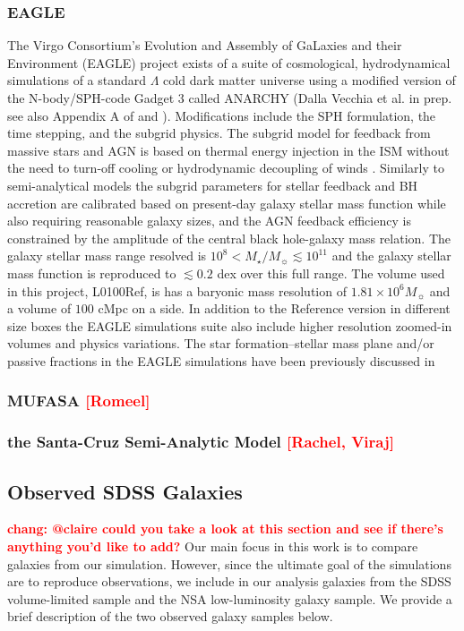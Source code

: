 \documentclass[preprint2,tighten]{aastex62}
\newcommand{\todo}[1]{{\bf \textcolor{red}{ #1}}}
\begin{document}
\subsubsection{EAGLE}
The Virgo Consortium's Evolution and Assembly of GaLaxies and their Environment (EAGLE) project \citep{schaye2015, crain2015} exists of a suite of cosmological, hydrodynamical simulations of a standard $\Lambda$ cold dark matter universe using a modified version of the N-body/SPH-code Gadget 3 \citep[lastly described in][]{springel2005} called ANARCHY (Dalla Vecchia et al. in prep. see also Appendix A of \citealp{schaye2015} and \citealp{schaller2015}). Modifications include the SPH formulation, the time stepping, and the subgrid physics. The subgrid model for feedback from massive stars and AGN is based on thermal energy injection in the ISM without the need to turn-off cooling or hydrodynamic decoupling of winds \citep{dallavecchia2012}. Similarly to semi-analytical models the subgrid parameters for stellar feedback and BH accretion are calibrated based on present-day galaxy stellar mass function while also requiring reasonable galaxy sizes, and the AGN feedback efficiency is constrained by the amplitude of the central black hole-galaxy mass relation. The galaxy stellar mass range resolved is $10^{8} < M_{\star}/M_{\sun} \lesssim 10^{11}$ and the galaxy stellar mass function is reproduced to $\lesssim 0.2$ dex over this full range. The volume used in this project, L0100Ref, is has a baryonic mass resolution of $1.81\times 10^6M_{\sun}$ and a volume of $100$ cMpc on a side. In addition to the Reference version in different size boxes the EAGLE simulations suite also include higher resolution zoomed-in volumes and physics variations. The star formation--stellar mass plane and/or passive fractions in the EAGLE simulations have been previously discussed in \citet{furlong2015, trayford2015, trayford2016, trayford2017}


\subsubsection{MUFASA \todo{[Romeel]}}

\subsubsection{the Santa-Cruz Semi-Analytic Model \todo{[Rachel, Viraj]}}

\subsection{Observed SDSS Galaxies} \label{sec:obvs}
\todo{chang: @claire could you take a look at this section and see if 
there's anything you'd like to add?}
Our main focus in this work is to compare galaxies from our simulation. 
However, since the ultimate goal of the simulations are to reproduce 
observations, we include in our analysis galaxies from the 
SDSS volume-limited sample and the NSA low-luminosity galaxy sample. 
We provide a brief description of the two observed galaxy samples 
below. 
\end{document}
